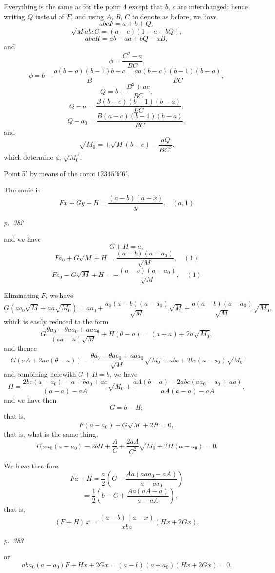 \documentclass[11pt,a4paper]{book}
\begin{document}
Everything is the same as for the point 4 except that $b$, $c$ are interchanged;
hence writing $Q$ instead of $F$, and using $A$, $B$, $C$ to denote as before, we have
\[
abc F = a + b + Q,
\]
\[
\sqrt{M} abc G = (a - c)(1 - a + b Q),
\]
\[
abc H = a b - a a + b Q - a B,
\]
and
\[
\phi = \frac{C^2 - a}{B C}.
\]
\[
\phi = b - \frac{a(b - a)(b - 1) b - c}{B} - \frac{a a(b - c)(b - 1)(b - a)}{B C},
\]
\[
Q = b + \frac{B^2 + a c}{B C},
\]
\[
Q - a = \frac{B(b - c)(b - 1)(b - a)}{B C},
\]
\[
Q - a_0 = \frac{B(a - c)(b - 1)(b - a)}{B C},
\]
and
\[
\sqrt{M_0} = \pm \sqrt{M}(b - c) - \frac{a Q}{B C^2}.
\]
which determine $\phi$, $\sqrt{M_0}$.

Point 5' by means of the conic $12345'6'6'$.

The conic is
\[
Fx + Gy + H = \frac{(a - b)(a - x)}{y}. \quad (a, 1)
\]

\clearpage

\bigskip
\textit{p.~382}
\smallskip

\noindent
and we have
\[
G + H = a,
\]
\[
F a_0 + G \sqrt{M} + H = \frac{(a - b)(a - a_0)}{\sqrt{M}}, \quad (1)
\]
\[
F a_0 - G \sqrt{M} + H = -\frac{(a - b)(a - a_0)}{\sqrt{M}}, \quad (1)
\]

Eliminating $F$, we have
\[
G(a a_0 \sqrt{M} + a a \sqrt{M_0}) = a a_0 + \frac{a_0 (a - b)(a - a_0)}{\sqrt{M}}\sqrt{M} + \frac{a(a - b)(a - a_0)}{\sqrt{M}}\sqrt{M_0},
\]
which is easily reduced to the form
\[
G \frac{\theta a_0 - \theta a a_0 + a a a_0}{(a a - a)\sqrt{M}} + H(\theta - a) = (a + a) + 2a \sqrt{M_0},
\]
and thence
\[
G(a A + 2a c(\theta - a)) - \frac{\theta a_0 - \theta a a_0 + a a a_0}{\sqrt{M}} \sqrt{M_0} + abc + 2 b c (a - a_0) \sqrt{M_0}
\]
and combining herewith $G + H = b$, we have
\[
H = \frac{2 b c (a - a_0) - a + b a_0 + a c}{(a - a) - a A} \sqrt{M_0} + \frac{a A(b - a) + 2 a b c (a a_0 - a_0 + a a)}{a A (a - a) - a A},
\]
and we have then
\[
G = b - H;
\]
that is,
\[
F(a - a_0) + G \sqrt{M} + 2 H = 0,
\]
that is, what is the same thing,
\[
F(a a_0 (a - a_0) - 2 b H + \frac{A}{C} + \frac{2 a A}{C^2} \sqrt{M_0} + 2 H(a - a_0) = 0.
\]

We have therefore
\[
F a + H = \frac{a}{2}\left(G - \frac{Aa(a a a_0 - a A)}{a - a a_0}\right)
\]
\[
\quad = \frac{1}{2}\left(b - G + \frac{Aa(a A + a)}{a - a A}\right),
\]
that is,
\[
(F + H)\,x = \frac{(a - b)(a - x)}{x b a} (Hx + 2 G x).
\]

\clearpage

\bigskip
\textit{p.~383}
\smallskip

\noindent
or
\[
ab a_0 (a - a_0) F + H x + 2 G x = (a - b)(a + a_0)(Hx + 2 G x) = 0.
\]
\end{document}
